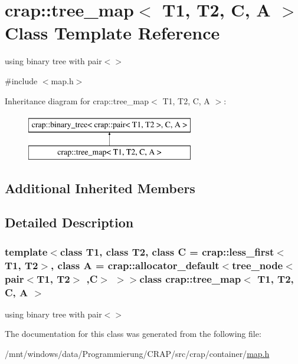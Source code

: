 \hypertarget{classcrap_1_1tree__map}{\section{crap\-:\-:tree\-\_\-map$<$ T1, T2, C, A $>$ Class Template Reference}
\label{classcrap_1_1tree__map}
}


using binary tree with pair$<$$>$  




{\ttfamily \#include $<$map.\-h$>$}

Inheritance diagram for crap\-:\-:tree\-\_\-map$<$ T1, T2, C, A $>$\-:\begin{figure}[H]
\begin{center}
\leavevmode
\includegraphics[height=2.000000cm]{classcrap_1_1tree__map}
\end{center}
\end{figure}
\subsection*{Additional Inherited Members}


\subsection{Detailed Description}
\subsubsection*{template$<$class T1, class T2, class C = crap\-::less\-\_\-first$<$\-T1, T2$>$, class A = crap\-::allocator\-\_\-default$<$tree\-\_\-node$<$ pair$<$\-T1, T2$>$ ,\-C$>$ $>$$>$class crap\-::tree\-\_\-map$<$ T1, T2, C, A $>$}

using binary tree with pair$<$$>$ 

The documentation for this class was generated from the following file\-:\begin{DoxyCompactItemize}
\item 
/mnt/windows/data/\-Programmierung/\-C\-R\-A\-P/src/crap/container/\hyperlink{map_8h}{map.\-h}\end{DoxyCompactItemize}
